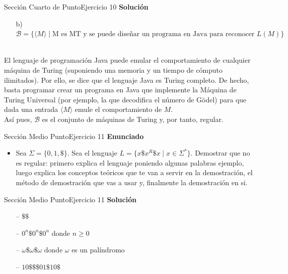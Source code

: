 \documentclass[10pt, envcountsect, presentation, aspectratio=169]{beamer}
\begin{document}
\begin{frame}{Sección Cuarto de Punto}{Ejercicio 10}
    \textbf{Solución}\\
    \begin{itemize}
        \item[b)] $\mathcal{B} = \{\langle M \rangle \mid \mbox{M es MT  y  se puede diseñar un programa en Java para reconocer } L(M)\}$\\~\\
    \end{itemize}

    El lenguaje de programación Java puede emular el comportamiento de cualquier máquina de Turing (suponiendo una memoria y un tiempo de cómputo ilimitados).
    Por ello, se dice que el lenguaje Java es Turing completo.
    De hecho, basta programar crear un programa en Java que implemente la Máquina de Turing Universal (por ejemplo, la que decodifica el número de Gödel) para que dada una entrada $\langle M \rangle$ emule el comportamiento de $M$. \\
    Así pues, $\mathcal{B}$ es el conjunto de máquinas de Turing y, por tanto, regular.  
\end{frame}


\begin{frame}{Sección Medio Punto}{Ejercicio 11}
    \textbf{Enunciado}
    \begin{itemize}
        \item Sea $\Sigma=\{0,1,\$\}$. Sea el lenguaje $L=\{x\$x^R\$x \mid x \in \Sigma^*\}$. Demostrar que no es regular: primero explica el lenguaje poniendo algunas palabras ejemplo, luego explica los conceptos teóricos que te van a servir en la demostración, el método de demostración que vas a usar y, finalmente la demostración en si.
    \end{itemize}
\end{frame}


\begin{frame}{Sección Medio Punto}{Ejercicio 11}
    \textbf{Solución}\\
    \begin{itemize}
        \item[--] $\$\$$
        \item[--] $0^n \$ 0^n \$ 0^n \text{ donde } n \geq 0$
        \item[--] $ \omega \$ \omega \$ \omega \text{ donde } \omega$ es un palíndromo 
        \item[--] $10\$ \$ \$01 \$ 10\$$  
    \end{itemize}
\end{frame}
\end{document}
